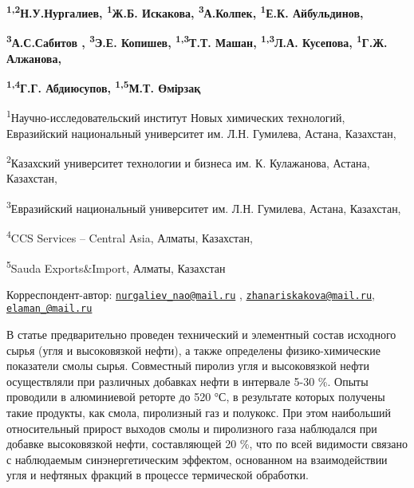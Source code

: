 
\begin{articleheader}

{\bfseries \textsuperscript{1,2}Н.У.Нургалиев\textsuperscript{\envelope },
\textsuperscript{1}Ж.Б. Искакова\textsuperscript{\envelope },
\textsuperscript{3}А.Колпек, \textsuperscript{1}Е.К.
Айбульдинов\textsuperscript{\envelope },}

{\bfseries \textsuperscript{3}А.С.Сабитов , \textsuperscript{3}Э.Е.
Копишев, \textsuperscript{1,3}Т.Т. Машан, \textsuperscript{1,3}Л.А.
Кусепова, \textsuperscript{1}Г.Ж. Алжанова,}

{\bfseries \textsuperscript{1,4}Г.Г. Абдиюсупов, \textsuperscript{1,5}М.Т.
Өмірзақ}
\end{articleheader}

\begin{affiliation}
\textsuperscript{1}Научно-исследовательский институт Новых химических
технологий, Евразийский национальный университет им. Л.Н. Гумилева,
Астана, Казахстан,

\textsuperscript{2}Казахский университет технологии и бизнеса им. К.
Кулажанова, Астана, Казахстан,

\textsuperscript{3}Евразийский национальный университет им. Л.Н.
Гумилева, Астана, Казахстан,

\textsuperscript{4}CCS Services -- Central Asia, Алматы, Казахстан,

\textsuperscript{5}Sauda Exports\&Import, Алматы, Казахстан

\raggedright {\bfseries \textsuperscript{\envelope }} Корреспондент-автор:
\href{mailto:nurgaliev_nao@mail.ru}{\nolinkurl{nurgaliev\_nao@mail.ru}}
,
\href{mailto:zhanariskakova@mail.ru}{\nolinkurl{zhanariskakova@mail.ru}},
\href{mailto:elaman_@mail.ru}{\nolinkurl{elaman\_@mail.ru}}
\end{affiliation}

В статье предварительно проведен технический и элементный состав
исходного сырья (угля и высоковязкой нефти), а также определены
физико-химические показатели смолы сырья. Совместный пиролиз угля и
высоковязкой нефти осуществляли при различных добавках нефти в интервале
5-30 \%. Опыты проводили в алюминиевой реторте до 520 °С, в результате
которых получены такие продукты, как смола, пиролизный газ и полукокс.
При этом наибольший относительный прирост выходов смолы и пиролизного
газа наблюдался при добавке высоковязкой нефти, составляющей 20 \%, что
по всей видимости связано с наблюдаемым синэнергетическим эффектом,
основанном на взаимодействии угля и нефтяных фракций в процессе
термической обработки.

